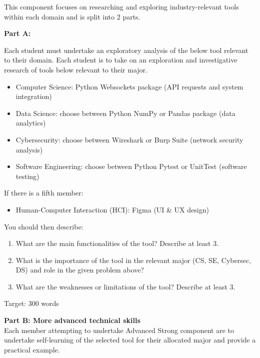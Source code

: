 \documentclass[a4paper, 11pt]{report}
\begin{document}
This component focuses on researching and exploring industry-relevant tools within each domain and is split into 2 parts.

\vspace{2ex}


\textbf{Part A:}

Each student must undertake an exploratory analysis of the below tool relevant to their domain. 
Each student is to take on an exploration and investigative research of tools below relevant to their major. 

\begin{itemize}
    \item Computer Science: Python Websockets package (API requests and system integration)
    \item Data Science: choose between Python NumPy or Pandas package (data analytics)
    \item Cybersecurity: choose between Wireshark or Burp Suite (network security analysis)
    \item Software Engineering: choose between Python Pytest or UnitTest (software testing)
\end{itemize}
If there is a fifth member:
\begin{itemize}
    \item Human-Computer Interaction (HCI): Figma (UI \& UX design)
\end{itemize}

\vspace{4ex}

You should then describe:
\begin{enumerate}
    \item What are the main functionalities of the tool? Describe at least 3.
    \item What is the importance of the tool in the relevant major (CS, SE, Cybersec, DS) and role in the given problem above?
    \item What are the weaknesses or limitations of the tool? Describe at least 3.
\end{enumerate}
Target: 300 words

\vspace{4ex}

\textbf{Part B: More advanced technical skills}\\

Each member attempting to undertake Advanced Strong component are to undertake self-learning of the selected tool for their allocated major and provide a practical example.
\end{document}

